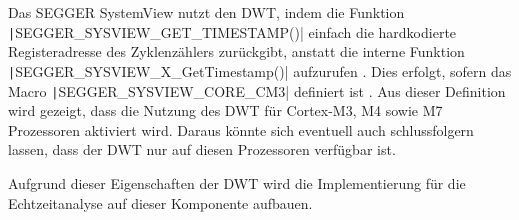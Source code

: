 Das SEGGER SystemView nutzt den DWT, indem die Funktion \linebreak
\texttt|SEGGER_SYSVIEW_GET_TIMESTAMP()| einfach die hardkodierte
Registeradresse des Zyklenzählers zurückgibt, anstatt die interne Funktion
\texttt|SEGGER_SYSVIEW_X_GetTimestamp()| aufzurufen
\cite{SystemView_Config, Arm_DWT_Programmers_Model}. Dies erfolgt, sofern das
Macro \texttt|SEGGER_SYSVIEW_CORE_CM3| definiert ist
\cite{SystemView_Config_79}. Aus dieser Definition wird gezeigt, dass die
Nutzung des DWT für Cortex-M3, M4 sowie M7 Prozessoren aktiviert wird. Daraus
könnte sich eventuell auch schlussfolgern lassen, dass der DWT nur auf diesen
Prozessoren verfügbar ist.

Aufgrund dieser Eigenschaften der DWT wird die Implementierung für die
Echtzeitanalyse auf dieser Komponente aufbauen.

